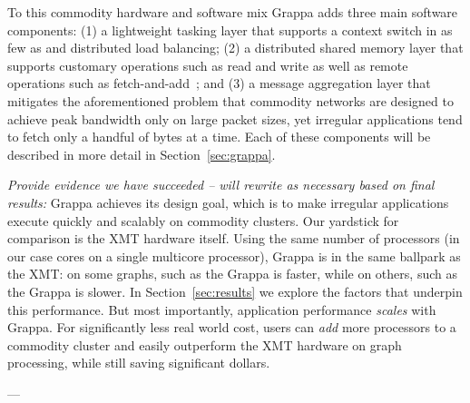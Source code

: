 To this commodity hardware and software mix Grappa adds three main software components: (1) a lightweight tasking layer that supports a context switch in as few as  and distributed load balancing; (2) a distributed shared memory layer that supports customary operations such as read and write as well as remote operations such as fetch-and-add~\cite{fetchandadd}; and (3) a message aggregation layer that mitigates the aforementioned problem that commodity networks are designed to achieve peak bandwidth only on large packet sizes, yet irregular applications tend to fetch only a handful of bytes at a time.  Each of these components will be described in more detail in Section~\ref{sec:grappa}.

{\em Provide evidence we have succeeded -- will rewrite as necessary based on final results:}
Grappa achieves its design goal, which is to make irregular applications execute quickly and scalably on commodity clusters.  Our yardstick for comparison is the XMT hardware itself.  Using the same number of processors (in our case cores on a single multicore processor), Grappa is in the same ballpark as the XMT: on some graphs, such as the  Grappa is  faster, while on others, such as the  Grappa is  slower.  In Section~\ref{sec:results} we explore the factors that underpin this performance.  But most importantly, application performance \emph{scales} with Grappa.  For significantly less real world cost, users can \emph{add} more processors to a commodity cluster and easily outperform the XMT hardware on graph processing, while still saving significant dollars.



---





